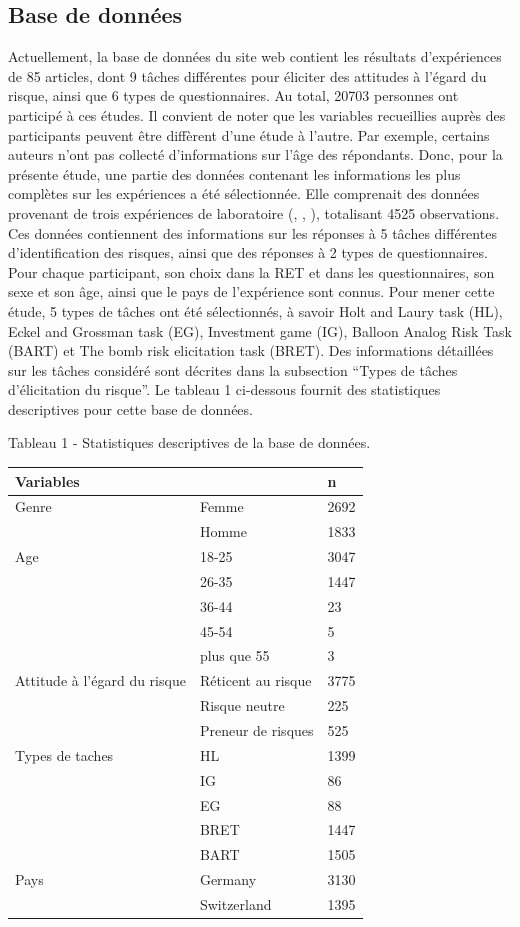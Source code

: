 \documentclass[12pt]{article}
\begin{document}
\subsection{Base de données}

Actuellement, la base de données du site web contient les résultats
d'expériences de 85 articles, dont 9 tâches différentes pour éliciter
des attitudes à l'égard du risque, ainsi que 6 types de questionnaires.
Au total, 20703 personnes ont participé à ces études. Il convient de
noter que les variables recueillies auprès des participants peuvent être
diffèrent d'une étude à l'autre. Par exemple, certains auteurs n'ont pas
collecté d'informations sur l'âge des répondants. Donc, pour la présente
étude, une partie des données contenant les informations les plus
complètes sur les expériences a été sélectionnée. Elle comprenait des
données provenant de trois expériences de laboratoire
(\citet{Crosetto2013}, \citet{Crosetto2016}, \citet{Frey2017}),
totalisant 4525 observations. Ces données contiennent des informations
sur les réponses à 5 tâches différentes d'identification des risques,
ainsi que des réponses à 2 types de questionnaires. Pour chaque
participant, son choix dans la RET et dans les questionnaires, son sexe
et son âge, ainsi que le pays de l'expérience sont connus. Pour mener
cette étude, 5 types de tâches ont été sélectionnés, à savoir Holt and
Laury task (HL), Eckel and Grossman task (EG), Investment game (IG),
Balloon Analog Risk Task (BART) et The bomb risk elicitation task
(BRET). Des informations détaillées sur les tâches considéré sont
décrites dans la subsection ``Types de tâches d'élicitation du risque''.
Le tableau 1 ci-dessous fournit des statistiques descriptives pour cette
base de données.

Tableau 1 - Statistiques descriptives de la base de données.

\begin{longtable}[]{@{}lll@{}}
\toprule()
Variables & & n \\
\midrule()
\endhead
Genre & Femme & 2692 \\
& Homme & 1833 \\
Age & 18-25 & 3047 \\
& 26-35 & 1447 \\
& 36-44 & 23 \\
& 45-54 & 5 \\
& plus que 55 & 3 \\
Attitude à l'égard du risque & Réticent au risque & 3775 \\
& Risque neutre & 225 \\
& Preneur de risques & 525 \\
Types de taches & HL & 1399 \\
& IG & 86 \\
& EG & 88 \\
& BRET & 1447 \\
& BART & 1505 \\
Pays & Germany & 3130 \\
& Switzerland & 1395 \\
\bottomrule()
\end{longtable}
\end{document}
